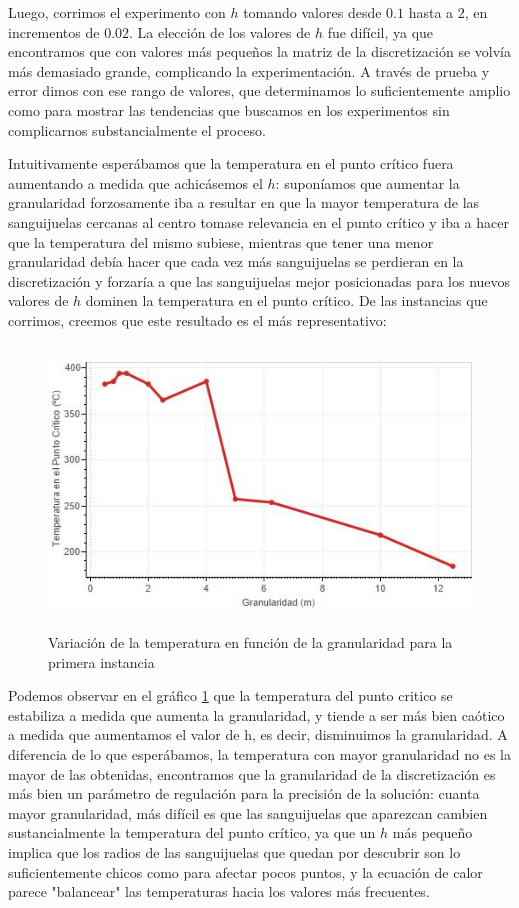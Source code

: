 Luego, corrimos el experimento con $h$ tomando valores desde $0.1$ hasta a $2$, en incrementos de $0.02$. La elección de los valores de $h$ fue difícil, ya que encontramos que con valores más pequeños la matriz de la discretización se volvía más demasiado grande, complicando la experimentación. A través de prueba y error dimos con ese rango de valores, que determinamos lo suficientemente amplio como para mostrar las tendencias que buscamos en los experimentos sin complicarnos substancialmente el proceso.

Intuitivamente esperábamos que la temperatura en el punto crítico fuera aumentando a medida que achicásemos el $h$: suponíamos que aumentar la granularidad forzosamente iba a resultar en que la mayor temperatura de las sanguijuelas cercanas al centro tomase relevancia en el punto crítico y iba a hacer que la temperatura del mismo subiese, mientras que tener una menor granularidad debía hacer que cada vez más sanguijuelas se perdieran en la discretización y forzaría a que las sanguijuelas mejor posicionadas para los nuevos valores de $h$ dominen la temperatura en el punto crítico. De las instancias que corrimos, creemos que este resultado es el más representativo:

\begin{figure}[h]
    \centering
    \includegraphics[resolution=300, width=484px, height=284px]{experimento 1-1}
    \caption{Variación de la temperatura en función de la granularidad para la primera instancia}
    \label{fig:exp11}
\end{figure}

Podemos observar en el gráfico \ref{fig:exp11} que la temperatura del punto critico se estabiliza a medida que aumenta la granularidad, y tiende a ser más bien caótico a medida que aumentamos el valor de h, es decir, disminuimos la granularidad. A diferencia de lo que esperábamos, la temperatura con mayor granularidad no es la mayor de las obtenidas, encontramos que la granularidad de la discretización es más bien un parámetro de regulación para la precisión de la solución: cuanta mayor granularidad, más difícil es que las sanguijuelas que aparezcan cambien sustancialmente la temperatura del punto crítico, ya que un $h$ más pequeño implica que los radios de las sanguijuelas que quedan por descubrir son lo suficientemente chicos como para afectar pocos puntos, y la ecuación de calor parece "balancear" las temperaturas hacia los valores más frecuentes.

